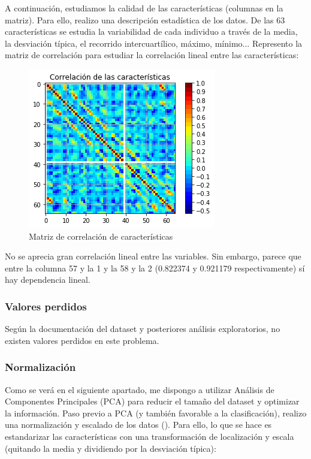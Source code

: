 A continuación, estudiamos la calidad de las características (columnas en la matriz). Para ello, realizo una descripción estadística de los datos. De las 63 características se estudia la variabilidad de cada individuo a través de la media, la desviación típica, el recorrido intercuartílico, máximo, mínimo... Represento la matriz de correlación para estudiar la correlación lineal entre las características:

\begin{figure}[H] %
	\centering
	\includegraphics[scale=0.8]{corr-matrix.png}  %
	\caption{Matriz de correlación de características} 
	\label{fig:corr-mat}
\end{figure}

No se aprecia gran correlación lineal entre las variables. Sin embargo, parece que entre la columna 57 y la 1 y la 58 y la 2 (0.822374 y 0.921179 respectivamente) sí hay dependencia lineal.

\subsubsection{Valores perdidos}

Según la documentación del dataset y posteriores análisis exploratorios, no existen valores perdidos en este problema.

\subsubsection{Normalización}

Como se verá en el siguiente apartado, me dispongo a utilizar Análisis de Componentes Principales (PCA) para reducir el tamaño del dataset y optimizar la información. Paso previo a PCA (y también favorable a la clasificación), realizo una normalización y escalado de los datos (\cite{st-sc}). Para ello, lo que se hace es estandarizar las características con una transformación de localización y escala (quitando la media y dividiendo por la desviación típica):


